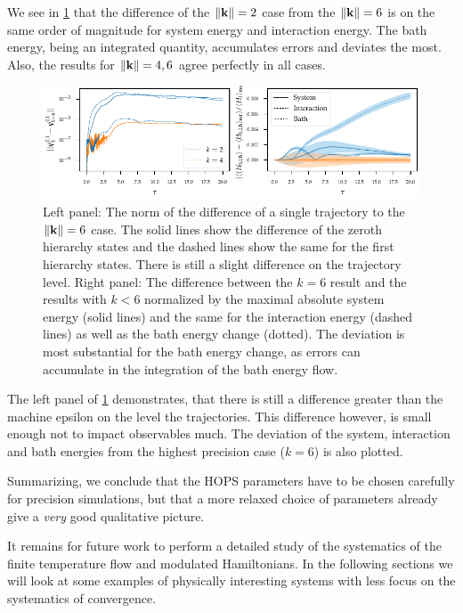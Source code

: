 We see in \cref{fig:k_systematics_system} that the difference of the
\(\norm{\vb{k}} = 2\) case from the \(\norm{\vb{k}} = 6\) is on the
same order of magnitude for system energy and interaction energy. The
bath energy, being an integrated quantity, accumulates errors and
deviates the most. Also, the results for \(\norm{\vb{k}} = 4,6\) agree
perfectly in all cases.
\begin{figure}[hp]
  \centering
  \includegraphics{figs/one_bath_syst/k_systematics_system}
  \caption{\label{fig:k_systematics_system} Left panel: The norm of
    the difference of a single trajectory to the \(\norm{\vb{k}} = 6\)
    case. The solid lines show the difference of the zeroth hierarchy
    states and the dashed lines show the same for the first hierarchy
    states.  There is still a slight difference on the trajectory
    level. Right panel: The difference between the \(k=6\) result and
    the results with \(k<6\) normalized by the maximal absolute system
    energy (solid lines) and the same for the interaction energy
    (dashed lines) as well as the bath energy change (dotted). The
    deviation is most substantial for the bath energy change, as
    errors can accumulate in the integration of the bath energy flow.}
\end{figure}
The left panel of \cref{fig:k_systematics_system} demonstrates, that there is still a
difference greater than the machine epsilon on the level the
trajectories. This difference however, is small enough not to impact
observables much.  The deviation of the system, interaction and bath
energies from the highest precision case (\(k=6\)) is also
plotted.


Summarizing, we conclude that the HOPS parameters have to be chosen
carefully for precision simulations, but that a more relaxed choice of
parameters already give a \emph{very} good qualitative picture.

 It remains for future work
to perform a detailed study of the systematics of the finite
temperature flow and modulated Hamiltonians. In the following sections
we will look at some examples of physically interesting systems with
less focus on the systematics of convergence.

